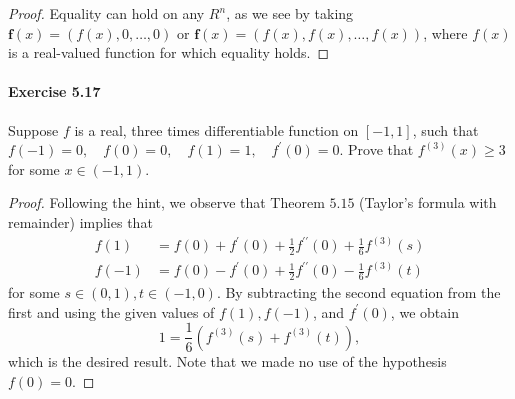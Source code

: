 \documentclass{article}
\theoremstyle{definition}
\begin{document}
\begin{proof}
Equality can hold on any $R^n$, as we see by taking $\mathbf{f}(x)=(f(x), 0, \ldots, 0)$ or $\mathbf{f}(x)=(f(x), f(x), \ldots, f(x))$, where $f(x)$ is a real-valued function for which equality holds.

\end{proof}



\paragraph{Exercise 5.17} Suppose $f$ is a real, three times differentiable function on $[-1,1]$, such that $f(-1)=0, \quad f(0)=0, \quad f(1)=1, \quad f^{\prime}(0)=0 .$ Prove that $f^{(3)}(x) \geq 3$ for some $x \in(-1,1)$.
\begin{proof}
    Following the hint, we observe that Theorem $5.15$ (Taylor's formula with remainder) implies that
$$
\begin{aligned}
f(1) &=f(0)+f^{\prime}(0)+\frac{1}{2} f^{\prime \prime}(0)+\frac{1}{6} f^{(3)}(s) \\
f(-1) &=f(0)-f^{\prime}(0)+\frac{1}{2} f^{\prime \prime}(0)-\frac{1}{6} f^{(3)}(t)
\end{aligned}
$$
for some $s \in(0,1), t \in(-1,0)$. By subtracting the second equation from the first and using the given values of $f(1), f(-1)$, and $f^{\prime}(0)$, we obtain
$$
1=\frac{1}{6}\left(f^{(3)}(s)+f^{(3)}(t)\right),
$$
which is the desired result. Note that we made no use of the hypothesis $f(0)=0$.
\end{proof}
\end{document}
